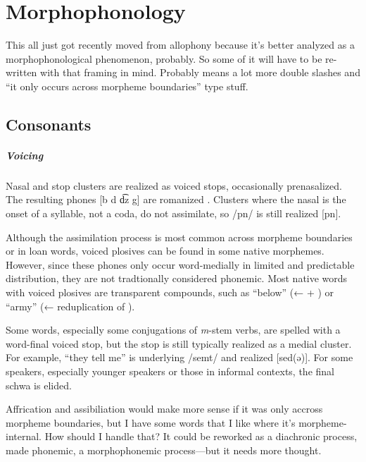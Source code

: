 \setchapterpreamble[u]{\margintoc}
\chapter{Morphophonology}
\begin{kaobox}[frametitle=\sc todo:]
This all just got recently moved from allophony because it's better analyzed as a morphophonological phenomenon, probably. So some of it will have to be re-written with that framing in mind. Probably means a lot more double slashes and “it only occurs across morpheme boundaries” type stuff.
\end{kaobox}
\section{Consonants} \label{sec:conso_morphono}
\paragraph{Voicing}
Nasal and stop clusters are realized as voiced stops, occasionally prenasalized. The resulting phones [b d d͡z g] are romanized .  Clusters where the nasal is the onset of a syllable, not a coda, do not assimilate, so /pn/ is still realized [pn]. 

Although the assimilation process is most common across morpheme boundaries or in loan words, voiced plosives can be found in some native morphemes. However, since these phones only occur word-medially in limited and predictable distribution, they are not tradtionally considered phonemic.  Most native words with voiced plosives are transparent compounds, such as  “below” (←  + ) or  “army” (← reduplication of ).

Some words, especially some conjugations of \emph{m}-stem verbs, are spelled with a word-final voiced stop, but the stop is still typically realized as a medial cluster. For example,  “they tell me” is underlying /semt/ and realized [sed(ə)]. For some speakers, especially younger speakers or those in informal contexts, the final schwa is elided.

\begin{kaobox}[frametitle=\sc todo:]
Affrication and assibiliation would make more sense if it was only accross morpheme boundaries, but I have some words that I like where it's morpheme-internal. How should I handle that? It could be reworked as a diachronic process, made phonemic, a morphophonemic process---but it needs more thought.
\end{kaobox}

